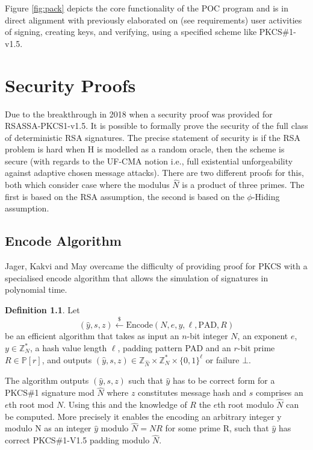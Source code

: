 \documentclass[]{final_report}
\theoremstyle{definition}
\newtheorem{definition}{Definition}[chapter]
\begin{document}
Figure \ref{fig:pack} depicts the core functionality of the POC program and is in direct alignment with previously elaborated on (see requirements) user activities of signing, creating keys, and verifying, using a specified scheme like PKCS\#1-v1.5.



\chapter{Security Proofs}
Due to the breakthrough in 2018 \cite{jager2018security} when a security proof was provided for RSASSA-PKCS1-v1.5. It is possible to formally prove the security of the full class of deterministic RSA signatures. The precise statement of security is if the RSA problem is hard when H is modelled as a random oracle, then the scheme is secure (with regards to the UF-CMA notion i.e., full existential unforgeability against adaptive chosen message attacks). There are two different proofs for this, both which consider case where the modulus $\widehat{N}$ is a product of three primes. The first is based on the RSA assumption, the second is based on the $\phi$-Hiding assumption.


\section{Encode Algorithm}


Jager, Kakvi and May overcame the difficulty of providing proof for PKCS with a specialised encode algorithm that allows the simulation of signatures in polynomial time.  

\begin{definition}
Let
\[
(\widehat{y}, s, z) \xleftarrow{\$} \text{Encode}(N, e, y, \ell, \text{PAD}, R)
\]
be an efficient algorithm that takes as input an \(n\)-bit integer \(N\), an exponent \(e\), \(y \in \mathbb{Z}_N^*\), a hash value length $\ell$, padding pattern PAD and an \(r\)-bit prime \(R \in \mathbb{P}[r]\), and outputs \((\widehat{y}, s, z) \in \mathbb{Z}_{\widehat{N}} \times \mathbb{Z}_N^* \times \{0, 1\}^\ell\) or failure \(\bot\). \

\end{definition}

The algorithm outputs \((\widehat{y}, s, z)\) such that \(\widehat{y}\) has to be correct form for a PKCS\#1 signature mod \(\widehat{N}\) where \(z\) constitutes message hash and \(s\) comprises an \(e\)th root mod \(N\). Using this and the knowledge of \(R\) the \(e\)th root modulo \(\widehat{N}\) can be computed. More precisely it enables the encoding an arbitrary integer y modulo N as an integer $\hat{y}$ modulo $\hat{N} = NR$ for some prime R, such that $\hat{y}$ has correct PKCS\#1-V1.5 padding modulo $\hat{N}$.
\end{document}
